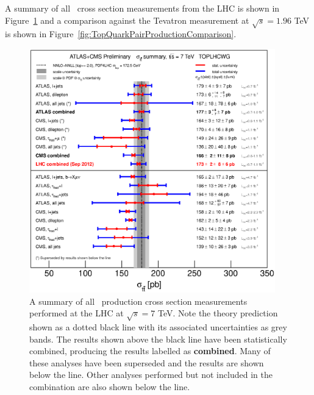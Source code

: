 A summary of all \ttbar\ cross section measurements from the LHC is shown in Figure~\ref{fig:TopQuarkPairProductionSummaryLHC} and a comparison against the Tevatron measurement at $\sqrt{s}=1.96$ TeV is shown in Figure~\ref{fig:TopQuarkPairProductionComparison}.

\begin{figure}[htbp]
  \centering
  \includegraphics[width=0.95\textwidth]{PartTopQuark/Plots/tt_xsec_7TeV.eps}
  \caption{A summary of all \ttbar\ production cross section measurements performed at the LHC at $\sqrt{s}=7$ TeV. Note the theory prediction shown as a dotted black line with its associated uncertainties as grey bands. The results shown above the black line have been statistically combined, producing the results labelled as \textbf{combined}. Many of these analyses have been superseded and the results are shown below the line. Other analyses performed but not included in the combination are also shown below the line.}
  \label{fig:TopQuarkPairProductionSummaryLHC}
\end{figure}

